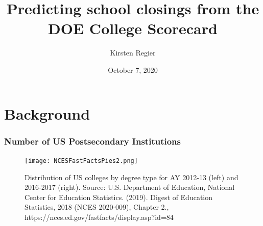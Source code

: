 \documentclass{beamer}
\title[College Scorecard]{Predicting school closings from the DOE College Scorecard} %
\author{Kirsten Regier} %
\date{October 7, 2020} %
\begin{document}
\begin{frame}
\titlepage %
\end{frame}


\section{Background} %
\begin{frame}
\frametitle{Number of US Postsecondary Institutions}

\begin{figure}
\begin{center}
\texttt{[image: NCESFastFactsPies2.png]}
\caption{Distribution of US colleges by degree type for AY 2012-13 (left) and 2016-2017 (right).  \newline
\tiny{Source: U.S. Department of Education, National Center for Education Statistics. (2019). Digest of Education Statistics, 2018 (NCES 2020-009), Chapter 2., https://nces.ed.gov/fastfacts/display.asp?id=84}}
\end{center}
\end{figure}

\end{frame}
\end{document}
